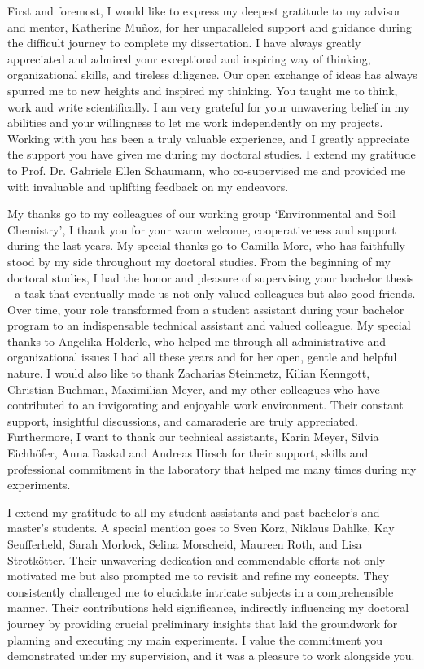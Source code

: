 \begin{acknowledgements}
\addchaptertocentry{\acknowledgementname} %
First and foremost, I would like to express my deepest gratitude to my advisor and mentor, Katherine Muñoz, for her unparalleled support and guidance during the difficult journey to complete my dissertation. I have always greatly appreciated and admired your exceptional and inspiring way of thinking, organizational skills, and tireless diligence. Our open exchange of ideas has always spurred me to new heights and inspired my thinking. You taught me to think, work and write scientifically. I am very grateful for your unwavering belief in my abilities and your willingness to let me work independently on my projects. Working with you has been a truly valuable experience, and I greatly appreciate the support you have given me during my doctoral studies. I extend my gratitude to Prof. Dr. Gabriele Ellen Schaumann, who co-supervised me and provided me with invaluable and uplifting feedback on my endeavors.


My thanks go to my colleagues of our working group ‘Environmental and Soil Chemistry’, I thank you for your warm welcome, cooperativeness and support during the last years. My special thanks go to Camilla More, who has faithfully stood by my side throughout my doctoral studies. From the beginning of my doctoral studies, I had the honor and pleasure of supervising your bachelor thesis - a task that eventually made us not only valued colleagues but also good friends. Over time, your role transformed from a student assistant during your bachelor program to an indispensable technical assistant and valued colleague. My special thanks to Angelika Holderle, who helped me through all administrative and organizational issues I had all these years and for her open, gentle and helpful nature. I would also like to thank Zacharias Steinmetz, Kilian Kenngott, Christian Buchman, Maximilian Meyer, and my other colleagues who have contributed to an invigorating and enjoyable work environment. Their constant support, insightful discussions, and camaraderie are truly appreciated. Furthermore, I want to thank our technical assistants, Karin Meyer, Silvia Eichhöfer, Anna Baskal and Andreas Hirsch for their support, skills and professional commitment in the laboratory that helped me many times during my experiments.


I extend my gratitude to all my student assistants and past bachelor's and master's students. A special mention goes to Sven Korz, Niklaus Dahlke, Kay Seufferheld, Sarah Morlock, Selina Morscheid, Maureen Roth, and Lisa Strotkötter. Their unwavering dedication and commendable efforts not only motivated me but also prompted me to revisit and refine my concepts. They consistently challenged me to elucidate intricate subjects in a comprehensible manner. Their contributions held significance, indirectly influencing my doctoral journey by providing crucial preliminary insights that laid the groundwork for planning and executing my main experiments. I value the commitment you demonstrated under my supervision, and it was a pleasure to work alongside you.



\end{acknowledgements}

